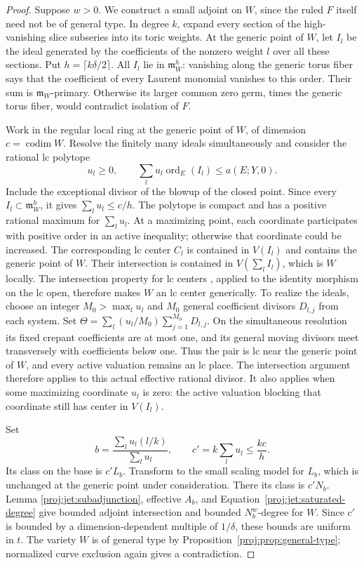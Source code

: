 \documentclass[11pt,letterpaper]{article}
\theoremstyle{definition}
\theoremstyle{remark}
\begin{document}
\begin{proof}
Suppose \(w>0\).  We construct a small adjoint on \(W\), since the
ruled \(F\) itself need not be of general type.  In degree \(k\),
expand every section of the high-vanishing slice subseries into
its toric weights.  At the generic point of \(W\), let \(I_l\) be
the ideal generated by the coefficients of the nonzero weight \(l\)
over all these sections.  Put \(h=\lceil k\delta/2\rceil\).
All \(I_l\) lie in \(\mathfrak m_W^h\): vanishing along the generic
torus fiber says that the coefficient of every Laurent monomial
vanishes to this order.  Their sum is
\(\mathfrak m_W\)-primary.  Otherwise its larger common zero germ,
times the generic torus fiber, would contradict isolation of \(F\).

Work in the regular local ring at the generic point of \(W\), of
dimension \(c=\operatorname{codim} W\).  Resolve the finitely many ideals
simultaneously and consider the rational lc polytope
\[
 u_l\ge0,\qquad
 \sum_lu_l\operatorname{ord}_E(I_l)\le a(E;Y,0).
\]
Include the exceptional divisor of the blowup of the closed point.
Since every \(I_l\subset\mathfrak m_W^h\), it gives
\(\sum_lu_l\le c/h\).  The polytope is compact and has a positive
rational maximum for \(\sum_lu_l\).  At a maximizing point, each
coordinate participates with positive order in an active
inequality; otherwise that coordinate could be increased.
The corresponding lc center \(C_l\) is contained in \(V(I_l)\)
and contains the generic point of \(W\).  Their intersection is
contained in \(V(\sum_l I_l)\), which is \(W\) locally.  The
intersection property for lc centers
\cite[Theorem~1.7]{Proj-KollarKovacs2010}, applied to the identity
morphism on the lc open, therefore makes \(W\) an lc center
generically.  To realize the ideals, choose an integer
\(M_0>\max_l u_l\) and \(M_0\) general coefficient divisors
\(D_{l,j}\) from each system.  Set
\(\Theta=\sum_l(u_l/M_0)\sum_{j=1}^{M_0}D_{l,j}\).
On the simultaneous resolution its fixed crepant coefficients are
at most one, and its general moving divisors meet transversely
with coefficients below one.  Thus the pair is lc near the generic
point of \(W\), and every active valuation remains an lc place.
The intersection argument therefore applies to this actual
effective rational divisor.  It also applies when some maximizing
coordinate \(u_l\) is zero: the active valuation blocking that
coordinate still has center in \(V(I_l)\).

Set
\[
 b=\frac{\sum_lu_l(l/k)}{\sum_lu_l},
 \qquad c'=k\sum_lu_l\le\frac{kc}{h}.
\]
Its class on the base is \(c'L_b\).  Transform to the small scaling
model for \(L_b\), which is unchanged at the generic point under
consideration.  There its class is \(c'N_b\).  Lemma
\ref{proj:jet:subadjunction}, effective \(A_b\), and
Equation~\eqref{proj:jet:saturated-degree} give bounded adjoint
intersection and bounded \(N_b^w\)-degree for \(W\).
Since \(c'\) is bounded by a dimension-dependent multiple of
\(1/\delta\), these bounds are uniform in \(t\).
The variety \(W\) is of general type by
Proposition~\ref{proj:prop:general-type}; normalized curve exclusion
again gives a contradiction.


\end{proof}
\end{document}
